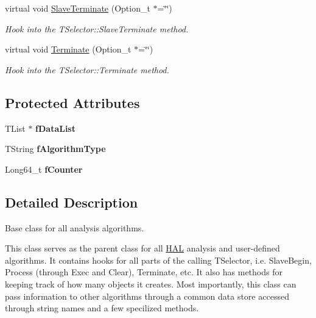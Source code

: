 \begin{DoxyCompactItemize}
virtual void \hyperlink{class_h_a_l_1_1_algorithm_a9735cc4d7ef34d440aff116c8dbf5cbb}{Slave\+Terminate} (Option\+\_\+t $\ast$=\char`\"{}\char`\"{})
\begin{DoxyCompactList}\small\item\em Hook into the T\+Selector\+::\+Slave\+Terminate method. \end{DoxyCompactList}\item 
virtual void \hyperlink{class_h_a_l_1_1_algorithm_ab974f3b6336b7b1002c72c04ad2b59cb}{Terminate} (Option\+\_\+t $\ast$=\char`\"{}\char`\"{})
\begin{DoxyCompactList}\small\item\em Hook into the T\+Selector\+::\+Terminate method. \end{DoxyCompactList}\end{DoxyCompactItemize}
\subsection*{Protected Attributes}
\begin{DoxyCompactItemize}
\item 
\hypertarget{class_h_a_l_1_1_algorithm_aacc4824bcc223fc86f0f57662393e56c}{T\+List $\ast$ {\bfseries f\+Data\+List}}\label{class_h_a_l_1_1_algorithm_aacc4824bcc223fc86f0f57662393e56c}

\item 
\hypertarget{class_h_a_l_1_1_algorithm_a15bbd1834a2413957b2946e051584d49}{T\+String {\bfseries f\+Algorithm\+Type}}\label{class_h_a_l_1_1_algorithm_a15bbd1834a2413957b2946e051584d49}

\item 
\hypertarget{class_h_a_l_1_1_algorithm_aa1b8acbcfb1019c60a09fec83c979e9a}{Long64\+\_\+t {\bfseries f\+Counter}}\label{class_h_a_l_1_1_algorithm_aa1b8acbcfb1019c60a09fec83c979e9a}

\end{DoxyCompactItemize}


\subsection{Detailed Description}
Base class for all analysis algorithms. 

This class serves as the parent class for all \hyperlink{namespace_h_a_l}{H\+A\+L} analysis and user-\/defined algorithms. It contains hooks for all parts of the calling T\+Selector, i.\+e. Slave\+Begin, Process (through Exec and Clear), Terminate, etc. It also has methods for keeping track of how many objects it creates. Most importantly, this class can pass information to other algorithms through a common data store accessed through string names and a few specilized methods. 

